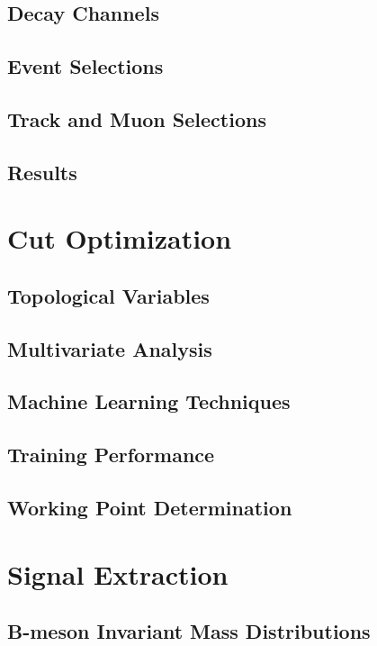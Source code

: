 \subsection{Decay Channels}

\subsection{Event Selections}

\subsection{Track and Muon Selections}

\subsection{Results}

\section{Cut Optimization} 

\subsection{Topological Variables}

\subsection{Multivariate Analysis}

\subsection{Machine Learning Techniques}

\subsection{Training Performance}

\subsection{Working Point Determination}

\section{Signal Extraction} 

\subsection{B-meson Invariant Mass Distributions}

